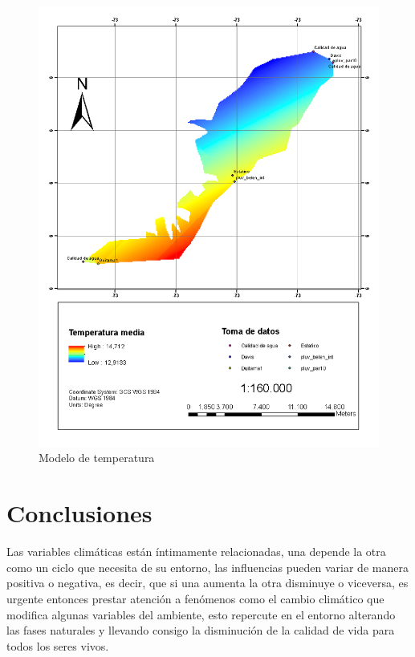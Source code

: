 \documentclass[conference,final,]{IEEEtran}
\makeatletter
\def\maxwidth{\ifdim\Gin@nat@width>\linewidth\linewidth
\else\Gin@nat@width\fi}
\let\Oldincludegraphics\includegraphics
\renewcommand{\includegraphics}[1]{\Oldincludegraphics[width=\maxwidth]{#1}}
\makeatother
\begin{document}
\begin{figure}
\centering
\includegraphics{paramo3.png}
\caption{Modelo de temperatura}
\end{figure}

\hypertarget{conclusiones}{%
\section{Conclusiones}\label{conclusiones}}

Las variables climáticas están íntimamente relacionadas, una depende la
otra como un ciclo que necesita de su entorno, las influencias pueden
variar de manera positiva o negativa, es decir, que si una aumenta la
otra disminuye o viceversa, es urgente entonces prestar atención a
fenómenos como el cambio climático que modifica algunas variables del
ambiente, esto repercute en el entorno alterando las fases naturales y
llevando consigo la disminución de la calidad de vida para todos los
seres vivos.
\end{document}
